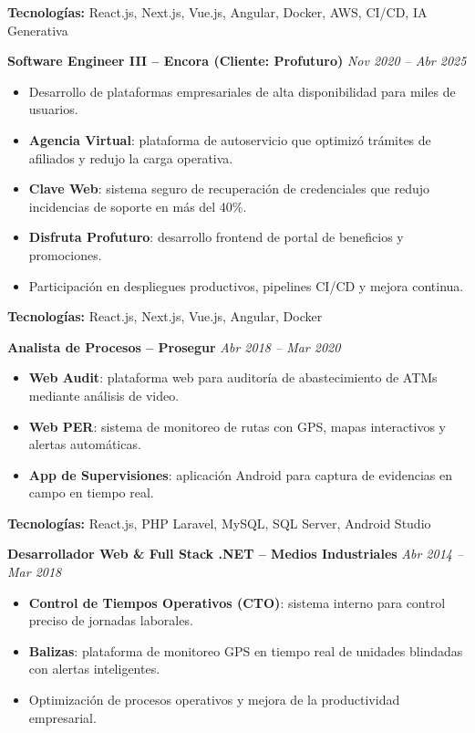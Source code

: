 \documentclass[11pt,a4paper]{article}
\begin{document}
\textbf{Tecnologías:} React.js, Next.js, Vue.js, Angular, Docker, AWS, CI/CD, IA Generativa

\vspace{12pt}

\textbf{Software Engineer III – Encora (Cliente: Profuturo)} \hfill \textit{Nov 2020 – Abr 2025}
\begin{itemize}[leftmargin=*]
  \item Desarrollo de plataformas empresariales de alta disponibilidad para miles de usuarios.
  \item \textbf{Agencia Virtual}: plataforma de autoservicio que optimizó trámites de afiliados y redujo la carga operativa.
  \item \textbf{Clave Web}: sistema seguro de recuperación de credenciales que redujo incidencias de soporte en más del 40\%.
  \item \textbf{Disfruta Profuturo}: desarrollo frontend de portal de beneficios y promociones.
  \item Participación en despliegues productivos, pipelines CI/CD y mejora continua.
\end{itemize}

\textbf{Tecnologías:} React.js, Next.js, Vue.js, Angular, Docker

\vspace{12pt}

\textbf{Analista de Procesos – Prosegur} \hfill \textit{Abr 2018 – Mar 2020}
\begin{itemize}[leftmargin=*]
  \item \textbf{Web Audit}: plataforma web para auditoría de abastecimiento de ATMs mediante análisis de video.
  \item \textbf{Web PER}: sistema de monitoreo de rutas con GPS, mapas interactivos y alertas automáticas.
  \item \textbf{App de Supervisiones}: aplicación Android para captura de evidencias en campo en tiempo real.
\end{itemize}

\textbf{Tecnologías:} React.js, PHP Laravel, MySQL, SQL Server, Android Studio

\vspace{12pt}

\textbf{Desarrollador Web \& Full Stack .NET – Medios Industriales} \hfill \textit{Abr 2014 – Mar 2018}
\begin{itemize}[leftmargin=*]
  \item \textbf{Control de Tiempos Operativos (CTO)}: sistema interno para control preciso de jornadas laborales.
  \item \textbf{Balizas}: plataforma de monitoreo GPS en tiempo real de unidades blindadas con alertas inteligentes.
  \item Optimización de procesos operativos y mejora de la productividad empresarial.
\end{itemize}
\end{document}
